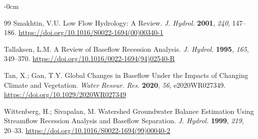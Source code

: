 \documentclass[hydrology,article,submit,pdftex,moreauthors]{Definitions/mdpi}
\begin{document}
\begin{adjustwidth}{-\extralength}{0cm}
\begin{thebibliography}{99}
Smakhtin, V.U. Low Flow Hydrology: A Review. \textit{J. Hydrol.} \textbf{2001}, \textit{240}, 147--186. \url{https://doi.org/10.1016/S0022-1694(00)00340-1}

Tallaksen, L.M. A Review of Baseflow Recession Analysis. \textit{J. Hydrol.} \textbf{1995}, \textit{165}, 349--370. \url{https://doi.org/10.1016/0022-1694(94)02540-R}

Tan, X.; Gan, T.Y. Global Changes in Baseflow Under the Impacts of Changing Climate and Vegetation. \textit{Water Resour. Res.} \textbf{2020}, \textit{56}, e2020WR027349. \url{https://doi.org/10.1029/2020WR027349}

Wittenberg, H.; Sivapalan, M. Watershed Groundwater Balance Estimation Using Streamflow Recession Analysis and Baseflow Separation. \textit{J. Hydrol.} \textbf{1999}, \textit{219}, 20--33. \url{https://doi.org/10.1016/S0022-1694(99)00040-2}

\end{thebibliography}

\end{adjustwidth}
\end{document}
